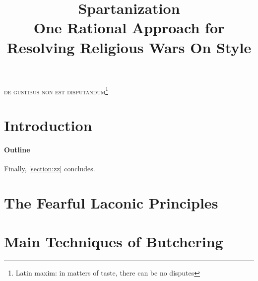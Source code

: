 \documentclass[preprint,10pt,nonatbib]{sigplanconf}
\title{%
  Spartanization\\
  One Rational Approach for Resolving Religious Wars On Style 
}
\begin{document}
\textsc{de gustibus non est disputandum\footnote{%
    Latin maxim: in matters of taste, there can be no disputes
}}
\maketitle
\eject
\begin{flushright}
  \begin{minipage}{2.5in}
    \normalsize \rmfamily\scshape
    \color{red}{%
      suum cuique \newline
      Tu mortale, essere avvertiti. \newline
      Tu non Shallt Rimuovere \newline
      Questo comandamento \newline
      Mentre ci sono segni di Haste \newline
      in questo documento !!!! \newline
    }
  \end{minipage}
\end{flushright}

\begin{abstract}
  
\end{abstract}
\section{Introduction}


\paragraph{Outline}
\label{section:principia}
\label{section:techniques}
\label{section:look}
\label{section:jack}
\label{section:look}
\label{section:initial}
\label{section:zz}
Finally, \cref{section:zz} concludes.

\section{The Fearful Laconic Principles}
\label{section:principia}


\section{Main Techniques of Butchering}
\label{section:techniques}

\end{document}
